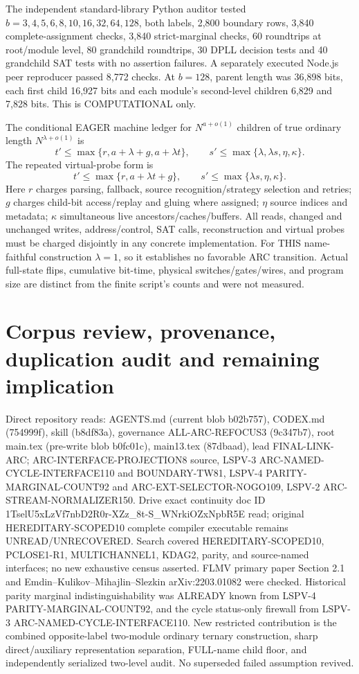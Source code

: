 \documentclass[11pt]{article}
\begin{document}
The independent standard-library Python auditor tested $b=3,4,5,6,8,10,16,32,64,128$, both labels, 2,800 boundary rows, 3,840 complete-assignment checks, 3,840 strict-marginal checks, 60 roundtrips at root/module level, 80 grandchild roundtrips, 30 DPLL decision tests and 40 grandchild SAT tests with no assertion failures. A separately executed Node.js peer reproducer passed 8,772 checks. At $b=128$, parent length was 36,898 bits, each first child 16,927 bits and each module's second-level children 6,829 and 7,828 bits. This is COMPUTATIONAL only.

The conditional EAGER machine ledger for $N^{a+o(1)}$ children of true ordinary length $N^{\lambda+o(1)}$ is
\[
 t'\le\max\{r,a+\lambda+g,a+\lambda t\},\qquad
 s'\le\max\{\lambda,\lambda s,\eta,\kappa\}.
\]
The repeated virtual-probe form is
\[
 t'\le\max\{r,a+\lambda t+g\},\qquad
 s'\le\max\{\lambda s,\eta,\kappa\}.
\]
Here $r$ charges parsing, fallback, source recognition/strategy selection and retries; $g$ charges child-bit access/replay and gluing where assigned; $\eta$ source indices and metadata; $\kappa$ simultaneous live ancestors/caches/buffers. All reads, changed and unchanged writes, address/control, SAT calls, reconstruction and virtual probes must be charged disjointly in any concrete implementation. For THIS name-faithful construction $\lambda=1$, so it establishes no favorable ARC transition. Actual full-state flips, cumulative bit-time, physical switches/gates/wires, and program size are distinct from the finite script's counts and were not measured.

\section{Corpus review, provenance, duplication audit and remaining implication}
Direct repository reads: AGENTS.md (current blob b02b757), CODEX.md (754999f), skill (b8df83a), governance ALL-ARC-REFOCUS3 (9c347b7), root main.tex (pre-write blob b0fc01c), main13.tex (87dbaad), lead FINAL-LINK-ARC; ARC-INTERFACE-PROJECTION8 source, LSPV-3 ARC-NAMED-CYCLE-INTERFACE110 and BOUNDARY-TW81, LSPV-4 PARITY-MARGINAL-COUNT92 and ARC-EXT-SELECTOR-NOGO109, LSPV-2 ARC-STREAM-NORMALIZER150. Drive exact continuity doc ID 1TselU5xLzVf7nbD2R0r-XZz_8t-S_WNrkiOZxNpbR5E read; original HEREDITARY-SCOPED10 complete compiler executable remains UNREAD/UNRECOVERED. Search covered HEREDITARY-SCOPED10, PCLOSE1-R1, MULTICHANNEL1, KDAG2, parity, and source-named interfaces; no new exhaustive census asserted. FLMV primary paper Section 2.1 and Emdin--Kulikov--Mihajlin--Slezkin arXiv:2203.01082 were checked. Historical parity marginal indistinguishability was ALREADY known from LSPV-4 PARITY-MARGINAL-COUNT92, and the cycle status-only firewall from LSPV-3 ARC-NAMED-CYCLE-INTERFACE110. New restricted contribution is the combined opposite-label two-module ordinary ternary construction, sharp direct/auxiliary representation separation, FULL-name child floor, and independently serialized two-level audit. No superseded failed assumption revived.
\end{document}
